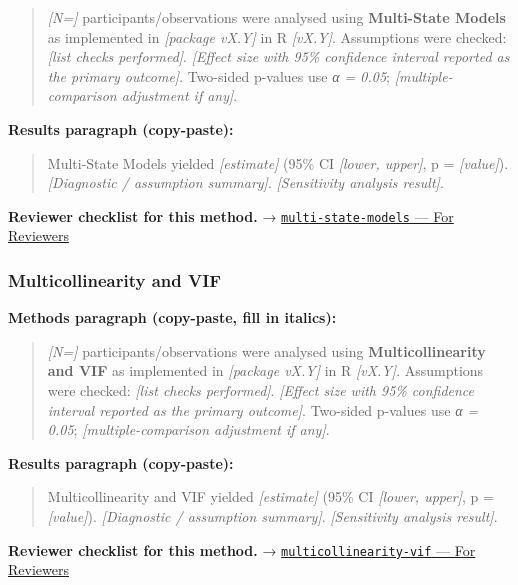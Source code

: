 \documentclass[
]{article}
\begin{document}
\begin{quote}
\emph{{[}N={]}} participants/observations were analysed using
\textbf{Multi-State Models} as implemented in \emph{{[}package vX.Y{]}}
in R \emph{{[}vX.Y{]}}. Assumptions were checked: \emph{{[}list checks
performed{]}}. \emph{{[}Effect size with 95\% confidence interval
reported as the primary outcome{]}}. Two-sided p-values use \emph{α =
0.05}; \emph{{[}multiple-comparison adjustment if any{]}}.
\end{quote}

\textbf{Results paragraph (copy-paste):}

\begin{quote}
Multi-State Models yielded \emph{{[}estimate{]}} (95\% CI
\emph{{[}lower, upper{]}}, p = \emph{{[}value{]}}). \emph{{[}Diagnostic
/ assumption summary{]}}. \emph{{[}Sensitivity analysis result{]}}.
\end{quote}

\textbf{Reviewer checklist for this method.} →
\href{../chapters/11-survival/multi-state-models.Rmd\#for-reviewers}{\texttt{multi-state-models}
--- For Reviewers}

\subsubsection{Multicollinearity and
VIF}\label{multicollinearity-and-vif}

\textbf{Methods paragraph (copy-paste, fill in italics):}

\begin{quote}
\emph{{[}N={]}} participants/observations were analysed using
\textbf{Multicollinearity and VIF} as implemented in \emph{{[}package
vX.Y{]}} in R \emph{{[}vX.Y{]}}. Assumptions were checked: \emph{{[}list
checks performed{]}}. \emph{{[}Effect size with 95\% confidence interval
reported as the primary outcome{]}}. Two-sided p-values use \emph{α =
0.05}; \emph{{[}multiple-comparison adjustment if any{]}}.
\end{quote}

\textbf{Results paragraph (copy-paste):}

\begin{quote}
Multicollinearity and VIF yielded \emph{{[}estimate{]}} (95\% CI
\emph{{[}lower, upper{]}}, p = \emph{{[}value{]}}). \emph{{[}Diagnostic
/ assumption summary{]}}. \emph{{[}Sensitivity analysis result{]}}.
\end{quote}

\textbf{Reviewer checklist for this method.} →
\href{../chapters/07-regression/multicollinearity-vif.Rmd\#for-reviewers}{\texttt{multicollinearity-vif}
--- For Reviewers}
\end{document}
